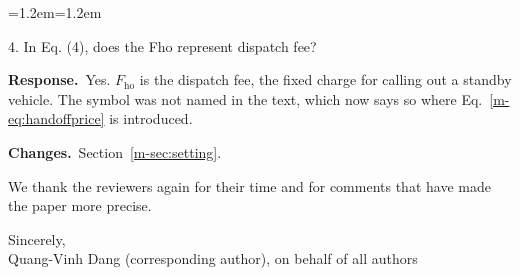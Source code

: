 \documentclass[11pt]{article}
\newenvironment{comment}{\par\medskip\noindent\color{rev}\itshape
  \begin{list}{}{\leftmargin=1.2em\rightmargin=1.2em}\item[]}%
  {\end{list}\par}
\newcommand{\resp}{\par\noindent\textbf{Response.}\ }
\newcommand{\chg}{\par\noindent\textbf{Changes.}\ }
\newcommand{\sref}[1]{Section~\ref{m-#1}}
\begin{document}
\begin{comment}
4. In Eq. (4), does the Fho represent dispatch fee?
\end{comment}
\resp Yes. $F_{\mathrm{ho}}$ is the dispatch fee, the fixed charge for
calling out a standby vehicle. The symbol was not named in the text,
which now says so where Eq.~\eqref{m-eq:handoffprice} is introduced.
\chg \sref{sec:setting}.

\bigskip
We thank the reviewers again for their time and for comments that have
made the paper more precise.

\medskip
\noindent Sincerely,\\
Quang-Vinh Dang (corresponding author), on behalf of all authors
\end{document}
